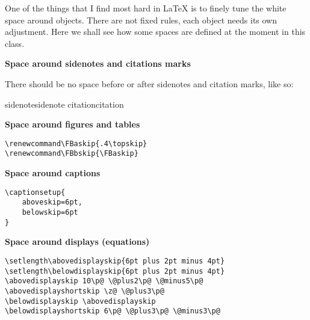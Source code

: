 One of the things that I find most hard in \LaTeX\xspace is to finely 
tune the white space around objects. There are not fixed rules, each 
object needs its own adjustment. Here we shall see how some spaces are 
defined at the moment in this class.

\textbf{Space around sidenotes and citations marks}

There should be no space before or after sidenotes and citation marks, 
like so:

sidenotesidenote\newline
citation\cite{James2013}citation

\textbf{Space around figures and tables}

\begin{lstlisting}[style=kaolstplain]
\renewcommand\FBaskip{.4\topskip}
\renewcommand\FBbskip{\FBaskip}
\end{lstlisting}

\textbf{Space around captions}

\begin{lstlisting}[style=kaolstplain]
\captionsetup{
	aboveskip=6pt,
	belowskip=6pt
}
\end{lstlisting}

\textbf{Space around displays (\eg equations)}

\begin{lstlisting}[style=kaolstplain]
\setlength\abovedisplayskip{6pt plus 2pt minus 4pt}
\setlength\belowdisplayskip{6pt plus 2pt minus 4pt}
\abovedisplayskip 10\p@ \@plus2\p@ \@minus5\p@
\abovedisplayshortskip \z@ \@plus3\p@
\belowdisplayskip \abovedisplayskip
\belowdisplayshortskip 6\p@ \@plus3\p@ \@minus3\p@
\end{lstlisting}
